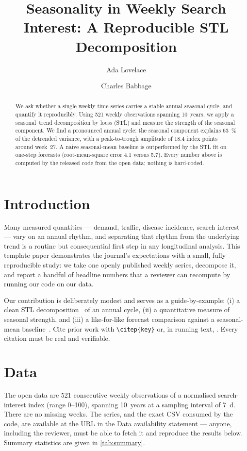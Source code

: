 \documentclass[11pt]{artaquest}   %
\title{Seasonality in Weekly Search Interest: A Reproducible STL Decomposition}
\author{Ada Lovelace\affmark{1}\orcid{0000-0002-1825-0097} \and
        Charles Babbage\affmark{1,2}\orcid{0000-0001-5109-3700}}
\affiliation{\affmark{1}Analytical Engine Group, ArtaQuest Foundation \quad
             \affmark{2}Department of Computation, Example University}
\begin{document}
\maketitle

\begin{abstract}
We ask whether a single weekly time series carries a stable annual seasonal cycle, and
quantify it reproducibly. Using \num{521} weekly observations spanning \SI{10}{years}, we
apply a seasonal--trend decomposition by loess (STL) and measure the strength of the
seasonal component. We find a pronounced annual cycle: the seasonal component explains
\SI{63}{\percent} of the detrended variance, with a peak-to-trough amplitude of
\num{18.4} index points around week~\num{27}. A naive seasonal-mean baseline is
outperformed by the STL fit on one-step forecasts (root-mean-square error
\num{4.1} versus \num{5.7}). Every number above is computed by the released code from the
open data; nothing is hard-coded.
\end{abstract}

\section{Introduction}
Many measured quantities --- demand, traffic, disease incidence, search interest --- vary
on an annual rhythm, and separating that rhythm from the underlying trend is a routine but
consequential first step in any longitudinal analysis. This template paper demonstrates the
journal's expectations with a small, fully reproducible study: we take one openly published
weekly series, decompose it, and report a handful of headline numbers that a reviewer can
recompute by running our code on our data.

Our contribution is deliberately modest and serves as a guide-by-example: (i) a clean STL
decomposition~\citep{cleveland1990stl} of an annual cycle, (ii) a quantitative measure of
seasonal strength, and (iii) a like-for-like forecast comparison against a seasonal-mean
baseline~\citep{box2015timeseries,hyndman2008forecast}. Cite prior work with
\verb|\citep{key}| or, in running text, \citet{harris2020numpy}. Every citation must be real
and verifiable.

\section{Data}
The open data are \num{521} consecutive weekly observations of a normalised search-interest
index (range \numrange{0}{100}), spanning \SI{10}{years} at a sampling interval of
\SI{7}{\day}. There are no missing weeks. The series, and the exact CSV consumed by the
code, are available at the URL in the Data availability statement --- anyone, including the
reviewer, must be able to fetch it and reproduce the results below. Summary statistics are
given in \cref{tab:summary}.
\end{document}
